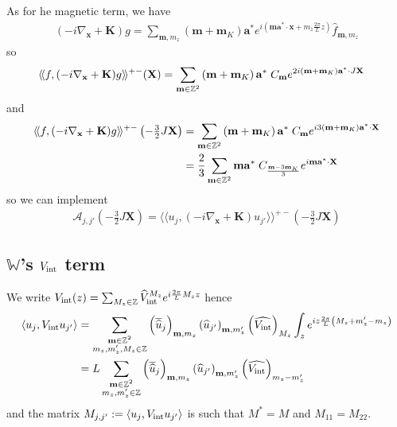 \documentclass[11pt,a4paper,reqno,french,tikz]{amsart}
\newcommand\cA{\mathcal{A}}\newcommand\cB{\mathcal{B}}\newcommand\cC{\mathcal{C}}\newcommand\cD{\mathcal{D}}\newcommand\cE{\mathcal{E}}\newcommand\cF{\mathcal{F}}\newcommand\cG{\mathcal{G}}\newcommand\cH{\mathcal{H}}\newcommand\cI{\mathcal{I}}\newcommand\cJ{\mathcal{J}}\newcommand\cK{\mathcal{K}}\newcommand\cL{\mathcal{L}}\newcommand\cM{\mathcal{M}}\newcommand\cN{\mathcal{N}}\newcommand\cO{\mathcal{O}}\newcommand\cP{\mathcal{P}}\newcommand\cQ{\mathcal{Q}}\newcommand\cR{\mathcal{R}}\newcommand\cS{\mathcal{S}}\newcommand\cT{\mathcal{T}}\newcommand\cU{\mathcal{U}}\newcommand\cV{\mathcal{V}}\newcommand\cW{\mathcal{W}}\newcommand\cX{\mathcal{X}}\newcommand\cY{\mathcal{Y}}\newcommand\cZ{\mathcal{Z}}
\newcommand{\pa}[1]{\left( #1 \right)} %
\newcommand{\ps}[1]{\left< #1 \right>} %
\newcommand{\na}{\nabla} %
\newcommand{\f}[2]{\frac{#1}{#2}} %
\newcommand{\ind}[1]{_{\textup{#1}}} %
\def\bX{{\mathbf X}}
\def\ba{{\mathbf a}}
\def\bx{{\mathbf x}}
\def\bmm{{\mathbf m}}
\def\bK{{\mathbf K}}
\def\bbW{{\mathbb W}}
\def\lAngle{\langle\!\langle}
\def\rAngle{\rangle\!\rangle}
\begin{document}
As for he magnetic term, we have
\begin{align*}
\pa{-i\na_\bx + \bK} g = \sum_{\bmm,m_z} \pa{\bmm + \bmm_K} \ba^* e^{i\pa{\bmm \ba^* \cdot \bx + m_z \f{2\pi}L z}} \widehat{f}_{\bmm,m_z}
\end{align*}
so
\begin{align*}
	\lAngle &f, (-i\nabla_\bx+\bK) g \rAngle^{+-}(\bX) =  \sum_{\bmm \in \Z^2} \pa{\bmm + \bmm_K}\ba^* \; C_\bmm e^{2i \pa{\bmm + \bmm_K} \ba^* \cdot J\bX} 
\end{align*}
and
\begin{align*}
	\lAngle f, (-i\nabla_\bx+\bK) g \rAngle^{+-}\pa{-\tfrac{3}{2}J\bX} &=  \sum_{\bmm \in \Z^2} \pa{\bmm + \bmm_K}\ba^* \; C_\bmm e^{i 3 \pa{\bmm + \bmm_K} \ba^* \cdot \bX} \\
		& = \f {2}3 \sum_{\bmm \in \Z^2} \bmm \ba^* \; C_{\f{\bmm - 3\bmm_K}{3}} e^{i \bmm \ba^* \cdot \bX} 
\end{align*}
so we can implement
\begin{align*}
\bm{\cA}_{j,j'}\pa{-\tfrac{3}{2}J\bX} = \lAngle u_j, (-i\nabla_\bx+\bK) u_{j'} \rAngle^{+-}\pa{-\tfrac{3}{2}J\bX}
\end{align*}

\subsection{$\bbW$'s $V\ind{int}$ term}%
\label{sub:_bbw_s_vint_term}
We write $V\ind{int}(z) = \sum_{M_z \in \Z} \widehat{V}\ind{int}^{M_z} e^{i \f{2\pi}L M_z z}$ hence
\begin{align*}
	\ps{u_j, V\ind{int} u_{j'}} &= \sum_{\substack{\bmm \in \Z^2 \\ m_z,m_z',M_z \in \Z}} \pa{\overline{\widehat{u}}_j}_{\bmm,m_z} \pa{\widehat{u}_{j'}}_{\bmm,m_z'}\pa{\widehat{V\ind{int}}}_{M_z} \int_z e^{iz \f{2\pi}{L} \pa{M_z + m_z'-m_z}} \\
& = L \sum_{\substack{\bmm \in \Z^2 \\ m_z,m_z' \in \Z}} \pa{\overline{\widehat{u}}_j}_{\bmm,m_z} \pa{\widehat{u}_{j'}}_{\bmm,m_z'}\pa{\widehat{V\ind{int}}}_{m_z-m_z'} 
\end{align*}
and the matrix $M_{j,j'} := \ps{u_j, V\ind{int} u_{j'}}$ is such that $M^* = M$ and $M_{11} = M_{22}$.
\end{document}
